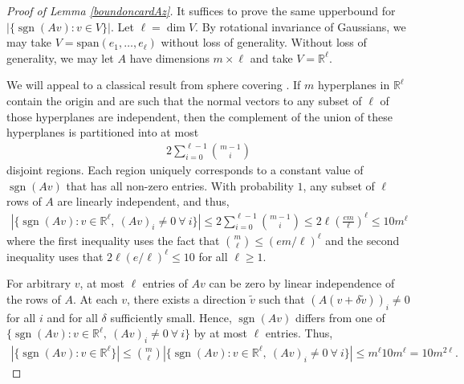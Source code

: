 \documentclass[11pt]{article}
\newcommand{\R}{\mathbb{R}}
\newcommand{\sgn}{\operatorname{sgn}}
\theoremstyle{remark}
\begin{document}
\begin{proof}[Proof of Lemma \ref{boundoncardAz}]
It suffices to prove the same upperbound for $|\{\sgn(Av) : v \in V\}|.$ Let $\ell = \dim V$. By rotational invariance of Gaussians, we may take $V = \text{span}(e_1,\dots,e_{\ell})$ without loss of generality. Without loss of generality, we may let $A$ have dimensions $m \times 
\ell$ and take $V = \R^{\ell}$.

We will appeal to a classical result from sphere covering \cite{sphere_covering}. If $m$ hyperplanes in $\R^{\ell}$ contain the origin and are such that the normal vectors to any subset of $\ell$ of those hyperplanes are independent, then the complement of the union of these hyperplanes is partitioned into at most \begin{align*}
2 \sum_{i = 0}^{\ell - 1} \binom{m-1}{i}
\end{align*} disjoint regions. Each region uniquely corresponds to a constant value of $\sgn(Av)$ that has all non-zero entries. With probability $1$, any subset of $\ell$ rows of $A$ are linearly independent, and thus, \begin{align*}
|\{\sgn(Av) : v \in \R^{\ell},\ (Av)_i \neq 0\ \forall\ i\}| \leqslant 2 \sum_{i=0}^{\ell - 1} \binom{m-1}{i} \leqslant 2\ell \left(\frac{e m}{\ell}\right)^{\ell} \leqslant 10m^{\ell}
\end{align*} where the first inequality uses the fact that $\binom{m}{\ell} \leqslant (em/\ell)^{\ell}$ and the second inequality uses that $2\ell (e/\ell)^{\ell} \leqslant 10$ for all $\ell \geqslant 1$.

For arbitrary $v$, at most $\ell$ entries of $Av$ can be zero by linear independence of the rows of $A$. At each $v$, there exists a direction $\tilde{v}$ such that $(A(v + \delta \tilde{v}))_{i} \neq 0$ for all $i$ and for all $\delta$ sufficiently small. Hence, $\sgn(Av)$ differs from one of $\{\sgn(Av) : v \in \R^{\ell},\ (Av)_{i} \neq 0\ \forall\ i\}$ by at most $\ell$ entries. Thus, \begin{align*}
|\{\sgn(Av) : v \in \R^{\ell}\}| \leqslant \binom{m}{\ell} |\{\sgn(Av) : v \in \R^{\ell},\ (Av)_i \neq 0\ \forall\ i\}| \leqslant m^{\ell} 10 m^{\ell} = 10m^{2\ell}.
\end{align*}
\end{proof}
\end{document}
